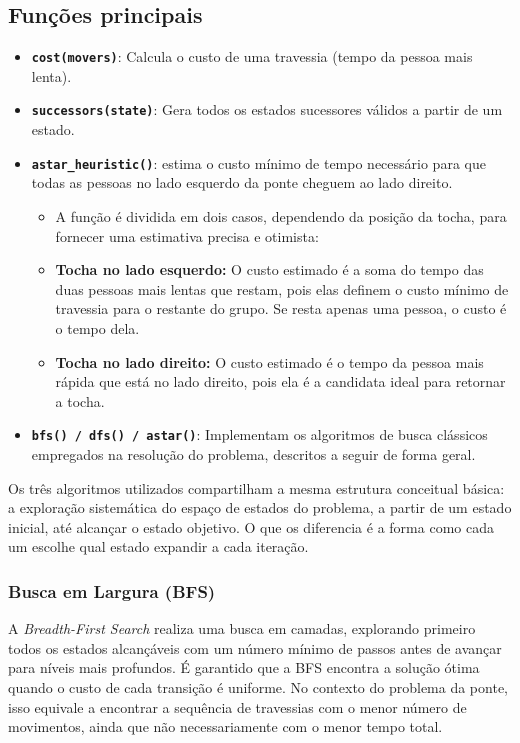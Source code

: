 \documentclass[12pt,a4paper]{article}
\begin{document}
\subsection{Funções principais}
\begin{itemize}
    \item \textbf{\texttt{cost(movers)}}: Calcula o custo de uma travessia (tempo da pessoa mais lenta).
    \item \textbf{\texttt{successors(state)}}: Gera todos os estados sucessores válidos a partir de um estado.
    \item \textbf{\texttt{astar\_heuristic()}}: estima o custo mínimo de tempo necessário para que todas as pessoas no lado esquerdo da ponte cheguem ao lado direito.
    \begin{itemize}
        \item A função é dividida em dois casos, dependendo da posição da tocha, para fornecer uma estimativa precisa e otimista:
        \item \textbf{Tocha no lado esquerdo:} O custo estimado é a soma do tempo das duas pessoas mais lentas que restam, pois elas definem o custo mínimo de travessia para o restante do grupo. Se resta apenas uma pessoa, o custo é o tempo dela.
        \item \textbf{Tocha no lado direito:} O custo estimado é o tempo da pessoa mais rápida que está no lado direito, pois ela é a candidata ideal para retornar a tocha.
    \end{itemize}
    \item \textbf{\texttt{bfs() / dfs() / astar()}}: Implementam os algoritmos de busca clássicos empregados na resolução do problema, descritos a seguir de forma geral.
\end{itemize}

Os três algoritmos utilizados compartilham a mesma estrutura conceitual básica: a exploração sistemática do espaço de estados do problema, a partir de um estado inicial, até alcançar o estado objetivo. O que os diferencia é a forma como cada um escolhe qual estado expandir a cada iteração.

\subsubsection{Busca em Largura (BFS)} 
A \textit{Breadth-First Search} realiza uma busca em camadas, explorando primeiro todos os estados alcançáveis com um número mínimo de passos antes de avançar para níveis mais profundos. 
É garantido que a BFS encontra a solução ótima quando o custo de cada transição é uniforme. No contexto do problema da ponte, isso equivale a encontrar a sequência de travessias com o menor número de movimentos, ainda que não necessariamente com o menor tempo total.
\end{document}
